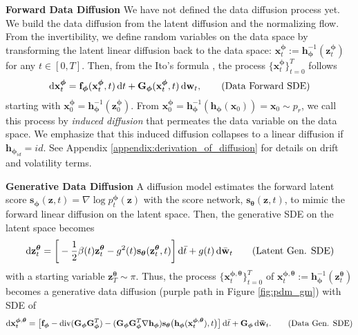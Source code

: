 \documentclass{article}
\theoremstyle{definition}
\theoremstyle{remark}
\newcommand*\diff{\mathop{}\!\mathrm{d}}
\begin{document}
	\textbf{Forward Data Diffusion} We have not defined the data diffusion process yet. We build the data diffusion from the latent diffusion and the normalizing flow. From the invertibility, we define random variables on the data space by transforming the latent linear diffusion back to the data space: $\mathbf{x}_{t}^{\bm{\phi}}:=\mathbf{h}_{\bm{\phi}}^{-1}(\mathbf{z}_{t}^{\bm{\phi}})$ for any $t\in [0,T]$. Then, from the Ito's formula \citep{oksendal2013stochastic}, the process $\{\mathbf{x}_{t}^{\bm{\phi}}\}_{t=0}^{T}$ follows
\begin{align*}
	\diff\mathbf{x}_{t}^{\bm{\phi}}=\mathbf{f}_{\bm{\phi}}(\mathbf{x}_{t}^{\bm{\phi}},t)\diff t+\mathbf{G}_{\bm{\phi}}(\mathbf{x}_{t}^{\bm{\phi}},t)\diff\mathbf{w}_{t},\tag{\text{Data Forward SDE}}
	\end{align*}
starting with $\mathbf{x}_{0}^{\bm{\phi}}=\mathbf{h}_{\bm{\phi}}^{-1}(\mathbf{z}_{0}^{\bm{\phi}})$. From $\mathbf{x}_{0}^{\bm{\phi}}=\mathbf{h}_{\bm{\phi}}^{-1}(\mathbf{h}_{\bm{\phi}}(\mathbf{x}_{0}))=\mathbf{x}_{0}\sim p_{r}$, we call this process by \textit{induced diffusion} that permeates the data variable on the data space. We emphasize that this induced diffusion collapses to a linear diffusion if $\mathbf{h}_{\bm{\phi}_{id}}=id$. See Appendix \ref{appendix:derivation_of_diffusion} for details on drift and volatility terms.


	\textbf{Generative Data Diffusion} A diffusion model estimates the forward latent score $\mathbf{s}_{\bm{\phi}}(\mathbf{z},t)=\nabla\log{p_{t}^{\bm{\phi}}(\mathbf{z})}$ with the score network, $\mathbf{s}_{\bm{\theta}}(\mathbf{z},t)$, to mimic the forward linear diffusion on the latent space. Then, the generative SDE on the latent space becomes 
	\begin{align*}
	\diff\mathbf{z}_{t}^{\bm{\theta}}=\bigg[-\frac{1}{2}\beta(t)\mathbf{z}_{t}^{\bm{\theta}}-g^{2}(t)\mathbf{s}_{\bm{\theta}}(\mathbf{z}_{t}^{\bm{\theta}},t)\bigg]\diff \bar{t}+g(t)\diff\bar{\mathbf{w}}_{t} \tag{\text{Latent Gen. SDE}}
	\end{align*}
	with a starting variable $\mathbf{z}_{T}^{\bm{\theta}}\sim\pi$. Thus, the process $\{\mathbf{x}_{t}^{\bm{\phi},\bm{\theta}}\}_{t=0}^{T}$ of $\mathbf{x}_{t}^{\bm{\phi},\bm{\theta}}:=\mathbf{h}_{\bm{\phi}}^{-1}(\mathbf{z}_{t}^{\bm{\theta}})$ becomes a generative data diffusion (purple path in Figure \ref{fig:pdm_gm}) with SDE of
	\begin{align*}
	\diff\mathbf{x}_{t}^{\bm{\phi},\bm{\theta}}=\big[\mathbf{f}_{\bm{\phi}}-\text{div}(\mathbf{G}_{\bm{\phi}}\mathbf{G}_{\bm{\phi}}^{T})-(\mathbf{G}_{\bm{\phi}}\mathbf{G}_{\bm{\phi}}^{T}\nabla\mathbf{h}_{\bm{\phi}})\mathbf{s}_{\bm{\theta}}\big(\mathbf{h}_{\bm{\phi}}(\mathbf{x}_{t}^{\bm{\phi},\bm{\theta}}),t\big)\big]\diff \bar{t} + \mathbf{G}_{\bm{\phi}}\diff\mathbf{\bar{w}}_{t}.\tag{\text{Data Gen. SDE}}
	\end{align*} 
	
\end{document}
